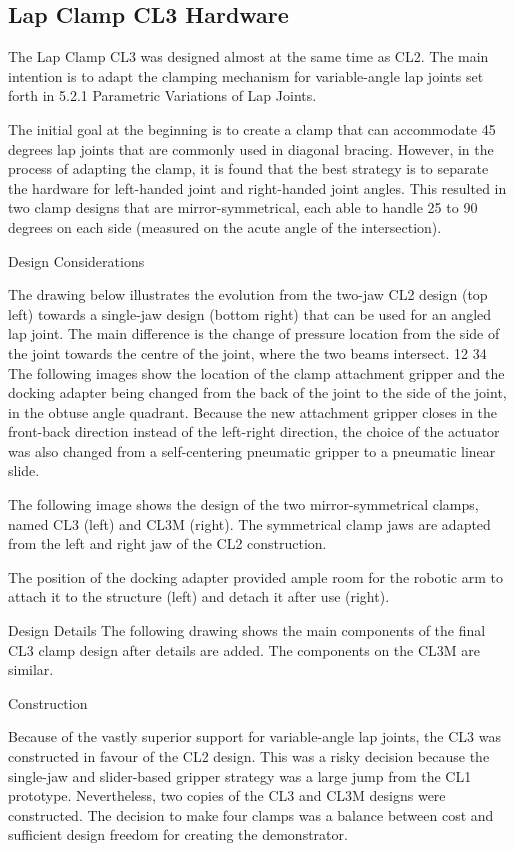 \subsection{Lap Clamp CL3 Hardware}
\label{subsection:exploration-2-lap-clamp-cl3-hardware}

The Lap Clamp CL3 was designed almost at the same time as CL2. The main intention is to adapt the clamping mechanism for variable-angle lap joints set forth in 5.2.1 Parametric Variations of Lap Joints. 

The initial goal at the beginning is to create a clamp that can accommodate 45 degrees lap joints that are commonly used in diagonal bracing. However, in the process of adapting the clamp, it is found that the best strategy is to separate the hardware for left-handed joint and right-handed joint angles. This resulted in two clamp designs that are mirror-symmetrical, each able to handle 25 to 90 degrees on each side (measured on the acute angle of the intersection). 

Design Considerations

The drawing below illustrates the evolution from the two-jaw CL2 design (top left) towards a single-jaw design (bottom right) that can be used for an angled lap joint. The main difference is the change of pressure location from the side of the joint towards the centre of the joint, where the two beams intersect.
12
34
The following images show the location of the clamp attachment gripper and the docking adapter being changed from the back of the joint to the side of the joint, in the obtuse angle quadrant. Because the new attachment gripper closes in the front-back direction instead of the left-right direction, the choice of the actuator was also changed from a self-centering pneumatic gripper to a pneumatic linear slide.


The following image shows the design of the two mirror-symmetrical clamps, named CL3 (left) and CL3M (right). The symmetrical clamp jaws are adapted from the left and right jaw of the CL2 construction.

The position of the docking adapter provided ample room for the robotic arm to attach it to the structure (left) and detach it after use (right). 

Design Details
The following drawing shows the main components of the final CL3 clamp design after details are added. The components on the CL3M are similar.


Construction

Because of the vastly superior support for variable-angle lap joints, the CL3 was constructed in favour of the CL2 design. This was a risky decision because the single-jaw and slider-based gripper strategy was a large jump from the CL1 prototype. Nevertheless, two copies of the CL3 and CL3M designs were constructed. The decision to make four clamps was a balance between cost and sufficient design freedom for creating the demonstrator.

